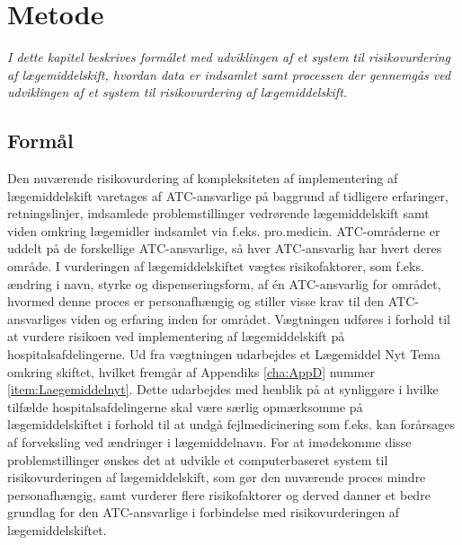 \chapter{Metode}
\textit{I dette kapitel beskrives formålet med udviklingen af et system til risikovurdering af lægemiddelskift, hvordan data er indsamlet samt processen der gennemgås ved udviklingen af et system til risikovurdering af lægemiddelskift.}

\section{Formål}
Den nuværende risikovurdering af kompleksiteten af implementering af lægemiddelskift varetages af ATC-ansvarlige på baggrund af tidligere erfaringer, retningslinjer, indsamlede problemstillinger vedrørende lægemiddelskift samt viden omkring lægemidler indsamlet via f.eks. pro.medicin. ATC-områderne er uddelt på de forskellige ATC-ansvarlige, så hver ATC-ansvarlig har hvert deres område. I vurderingen af lægemiddelskiftet vægtes risikofaktorer, som f.eks. ændring i navn, styrke og dispenseringsform, af én ATC-ansvarlig for området, hvormed denne proces er personafhængig og stiller visse krav til den ATC-ansvarliges viden og erfaring inden for området. Vægtningen udføres i forhold til at vurdere risikoen ved implementering af lægemiddelskift på hospitalsafdelingerne. Ud fra vægtningen udarbejdes et Lægemiddel Nyt Tema omkring skiftet, hvilket fremgår af Appendiks \ref{cha:AppD} nummer \ref{item:Laegemiddelnyt}. Dette udarbejdes med henblik på at synliggøre i hvilke tilfælde hospitalsafdelingerne skal være særlig opmærksomme på lægemiddelskiftet i forhold til at undgå fejlmedicinering som f.eks. kan forårsages af forveksling ved ændringer i lægemiddelnavn.
For at imødekomme disse problemstillinger ønskes det at udvikle et computerbaseret system til risikovurderingen af lægemiddelskift, som gør den nuværende proces mindre personafhængig, samt vurderer flere risikofaktorer og derved danner et bedre grundlag for den ATC-ansvarlige i forbindelse med risikovurderingen af lægemiddelskiftet. 



